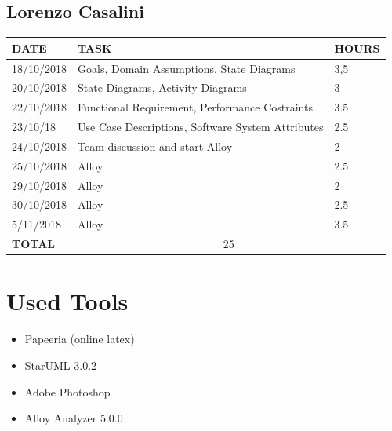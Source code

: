 \documentclass[12pt]{article}
\begin{document}
\subsection{Lorenzo Casalini}

\begin{center}
\begin{tabular}{ |p{}|p{}|p{}| } 
 \hline
 \textbf{DATE} & \textbf{TASK} & \textbf{HOURS} \\ 
  \hline
  18/10/2018 & Goals, Domain Assumptions, State Diagrams & 3,5\\ 
  \hline 
  20/10/2018 & State Diagrams, Activity Diagrams & 3 \\
  \hline
  22/10/2018 & Functional Requirement, Performance Costraints & 3.5 \\
  \hline
  23/10/18 & Use Case Descriptions, Software System Attributes & 2.5 \\
  \hline
  24/10/2018 & Team discussion and start Alloy & 2 \\ 
  \hline
  25/10/2018 & Alloy & 2.5 \\ 
  \hline
  29/10/2018 & Alloy & 2 \\ 
  \hline 
  30/10/2018 & Alloy & 2.5\\
  \hline
  5/11/2018 & Alloy & 3.5 \\ 
  \hline
  \textbf{TOTAL} & \multicolumn{2}{c|}{25} \\ 
  \hline
\end{tabular}
\end{center}


\section{Used Tools}
\begin{itemize}
    \item Papeeria (online latex)
    \item StarUML 3.0.2
    \item Adobe Photoshop
    \item Alloy Analyzer 5.0.0
\end{itemize}
\end{document}
